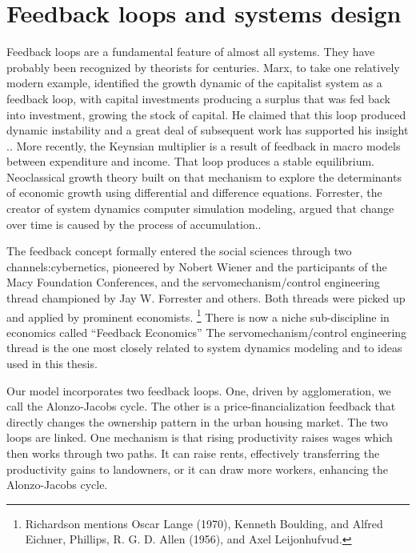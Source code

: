 \section{Feedback loops and systems design}


Feedback loops are a fundamental feature of almost all systems. They have probably been recognized by theorists for centuries. Marx, to take one relatively modern example, identified the growth dynamic of the capitalist system  as a feedback loop, with capital investments producing a surplus that was fed back into investment, growing the stock of capital. He  claimed that this loop produced dynamic instability and a great deal of subsequent work has supported his insight \cite{dumenilStabilityInstabilityDynamic1986}.\cite{schumpeterInstabilityCapitalism1928}. More recently, the Keynsian multiplier is a result of feedback in macro models between expenditure and income. That loop produces a stable equilibrium. Neoclassical growth theory built on that mechanism to explore the determinants of economic growth using differential and difference equations. Forrester, the creator of system dynamics computer simulation modeling, argued that change over time is caused by the process of accumulation..


The feedback concept formally entered the social sciences through two channels:cybernetics, pioneered by Nobert Wiener  and the participants of the Macy Foundation Conferences, and the servomechanism/control engineering thread championed by Jay W. Forrester and others. Both threads were picked up and applied by prominent economists. \footnote{Richardson \cite{richardsonFeedbackThoughtSocial1991} mentions Oscar Lange (1970), Kenneth Boulding, and Alfred Eichner, Phillips,  R. G. D. Allen (1956), and Axel Leijonhufvud.} There is now a niche sub-discipline in economics called ``Feedback Economics'' \cite{radzickiIntroductionFeedbackEconomics, cavanaFeedbackEconomicsEconomic2021}  The servomechanism/control engineering thread is the one most closely related to \gls{system dynamics} modeling and to ideas used in this thesis.

Our model incorporates two feedback loops. One, driven by agglomeration, we call the Alonzo-Jacobs cycle. The other is a price-financialization feedback that directly changes the ownership pattern in the urban housing market. The two loops are linked. One mechanism is that rising productivity raises wages which then works through two paths. It can raise rents, effectively transferring the productivity gains to landowners, or it can draw more workers, enhancing the Alonzo-Jacobs cycle. 

